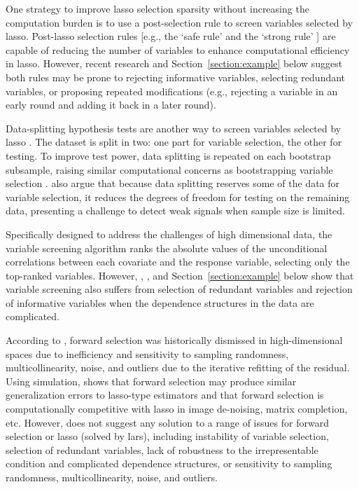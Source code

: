 \documentclass[11pt,review,authoryear]{elsarticle}
\begin{document}
One strategy to improve lasso selection sparsity without increasing the computation burden is to use a post-selection rule to screen variables selected by lasso. Post-lasso selection rules [e.g., the `safe rule' \citep{ghaoui2010safe} and the `strong rule' \citep{tibshirani2012strong}] are capable of reducing the number of variables to enhance computational efficiency in lasso. However, recent research \citep{wang2014safe, zeng2017efficient} and Section~\ref{section:example} below suggest both rules may be prone to rejecting informative variables, selecting redundant variables, or proposing repeated modifications (e.g., rejecting a variable in an early round and adding it back in a later round).

Data-splitting hypothesis tests are another way to screen variables selected by lasso \citep{wasserman2009high, meinshausen2009p,romano2019multiple, diciccio2020exact}. The dataset is split in two: one part for variable selection, the other for testing. To improve test power, data splitting is repeated on each bootstrap subsample, raising similar computational concerns as bootstrapping variable selection \citep{bach2008bolasso}. \citet{diciccio2020exact} also argue that because data splitting reserves some of the data for variable selection, it reduces the degrees of freedom for testing on the remaining data, presenting a challenge to detect weak signals when sample size is limited.

Specifically designed to address the challenges of high dimensional data, the variable screening algorithm \citep{fan2008sure, hall2009using,hall2009usingb, li2012robust, li2012feature} ranks the absolute values of the unconditional correlations between each covariate and the response variable, selecting only the top-ranked variables. However, \citet{fan2008sure}, \citet{barut2016conditional}, and Section~\ref{section:example} below show that variable screening also suffers from selection of redundant variables and rejection of informative variables when the dependence structures in the data are complicated.

According to \citet{friedman2001elements, weisberg04}, forward selection was historically dismissed in high-dimensional spaces due to inefficiency and sensitivity to sampling randomness, multicollinearity, noise, and outliers due to the iterative refitting of the residual. Using simulation, \citet{tibshirani2015general} shows that forward selection may produce similar generalization errors to lasso-type estimators and that forward selection is computationally competitive with lasso in image de-noising, matrix completion, etc. However, \citet{tibshirani2015general} does not suggest any solution to a range of issues for forward selection or lasso (solved by lars), including instability of variable selection, selection of redundant variables, lack of robustness to the irrepresentable condition and complicated dependence structures, or sensitivity to sampling randomness, multicollinearity, noise, and outliers.
\end{document}
